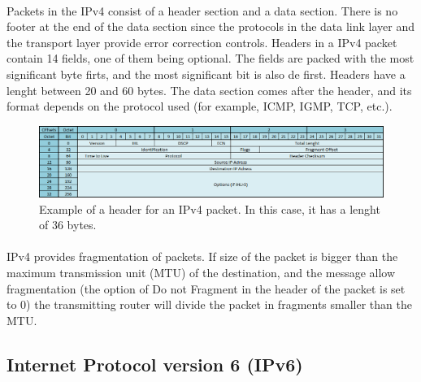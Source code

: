 \documentclass[12pt,a4paper]{report}
\begin{document}
\paragraph{}Packets in the IPv4 consist of a header section and a data section. There is no footer at the end of the data section since the protocols in the data link layer and the transport layer provide error correction controls. Headers in a IPv4 packet contain 14 fields, one of them being optional. The fields are packed with the most significant byte firts, and the most significant bit is also de first. Headers have a lenght between 20 and 60 bytes. The data section comes after the header, and its format depends on the protocol used (for example, ICMP, IGMP, TCP, etc.).
\begin{figure}[H]
\begin{center}
\includegraphics[scale=0.6]{IPv4_header.PNG}
\caption[IPv4 header]{Example of a header for an IPv4 packet. In this case, it has a lenght of 36 bytes.}
\end{center}
\end{figure}
\paragraph{}IPv4 provides fragmentation of packets. If size of the packet is bigger than the maximum transmission unit (MTU) of the destination, and the message allow fragmentation (the option of Do not Fragment in the header of the packet is set to 0) the transmitting router will divide the packet in fragments smaller than the MTU.

\subsection{Internet Protocol version 6 (IPv6)}
\end{document}
